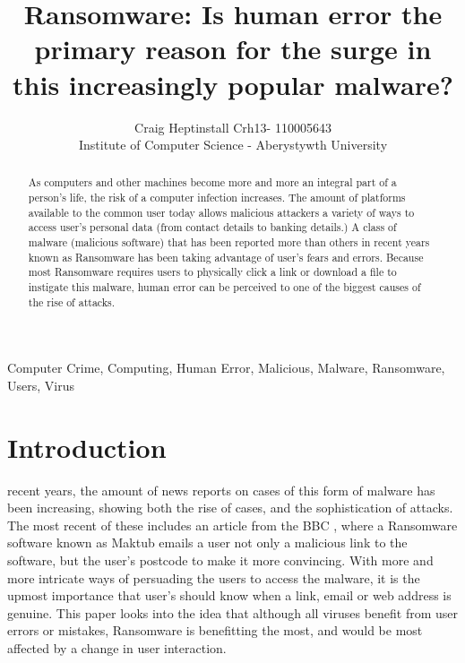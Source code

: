 \documentclass[journal,comsoc]{IEEEtran}
\begin{document}
\title{Ransomware: Is human error the primary reason for the surge in this increasingly popular malware?}
\author{Craig Heptinstall Crh13- 110005643\\Institute of Computer Science - Aberystywth University}
\maketitle

\begin{abstract}
As computers and other machines become more and more an integral part of a person's life, the risk of a computer infection increases. The amount of platforms available to the common user today allows malicious attackers a variety of ways to access user's personal data (from contact details to banking details.) A class of malware (malicious software) that has been reported more than others in recent years known as Ransomware has been taking advantage of user's fears and errors. Because most Ransomware requires users to physically click a link or download a file to instigate this malware, human error can be perceived to one of the biggest causes of the rise of attacks. 
\end{abstract}

\begin{IEEEkeywords}
Computer Crime, Computing, Human Error, Malicious, Malware, Ransomware, Users, Virus
\end{IEEEkeywords}

\IEEEpeerreviewmaketitle

\section{Introduction}
 recent years, the amount of news reports on cases of this form of malware has been increasing, showing both the rise of cases, and the sophistication of attacks. The most recent of these includes an article from the BBC \cite{bbc-Ransomware}, where a Ransomware software known as Maktub emails a user not only a malicious link to the software, but the user's postcode to make it more convincing. With more and more intricate ways of persuading the users to access the malware, it is the upmost importance that user's should know when a link, email or web address is genuine. This paper looks into the idea that although all viruses benefit from user errors or mistakes, Ransomware is benefitting the most, and would be most affected by a change in user interaction.
\end{document}
